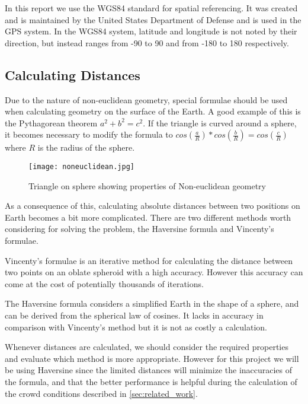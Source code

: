 In this report we use the WGS84 standard for spatial referencing. It was created and is maintained by the United States Department of Defense \cite{WGS84} and is used in the GPS system. In the WGS84 system, latitude and longitude is not noted by their direction, but instead ranges from -90 to 90 and from -180 to 180 respectively.

\subsection{Calculating Distances}

Due to the nature of non-euclidean geometry, special formulae should be used when calculating geometry on the surface of the Earth. A good example of this is the Pythagorean theorem $a^2 + b^2 = c^2$. If the triangle is curved around a sphere, it becomes necessary to modify the formula to $cos(\frac{a}{R}) * cos(\frac{b}{R}) = cos(\frac{c}{R})$ where $R$ is the radius of the sphere\cite{website:lawofcosines}.

\begin{figure}
    \centering
\texttt{[image: noneuclidean.jpg]}
\caption[Triangle on sphere]{Triangle on sphere showing properties of Non-euclidean geometry \cite{earthtriangle}}
\label{noneuclidean}
\end{figure}

As a consequence of this, calculating absolute distances between two positions on Earth becomes a bit more complicated. There are two different methods worth considering for solving the problem, the Haversine formula and Vincenty's formulae.

Vincenty's formulae\cite{vincenty} is an iterative method for calculating the distance between two points on an oblate spheroid with a high accuracy. However this accuracy can come at the cost of potentially thousands of iterations.

The Haversine formula considers a simplified Earth in the shape of a sphere, and can be derived from the spherical law of cosines\cite{website:lawofcosines}. It lacks in accuracy in comparison with Vincenty's method but it is not as costly a calculation.

Whenever distances are calculated, we should consider the required properties and evaluate which method is more appropriate. However for this project we will be using Haversine since the limited distances will minimize the inaccuracies of the formula, and that the better performance is helpful during the calculation of the crowd conditions described in \cref{sec:related_work}.


